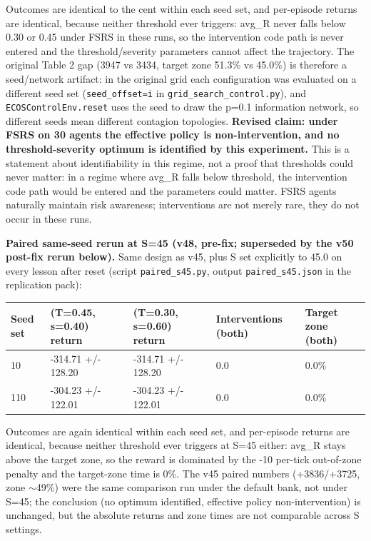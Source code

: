 \documentclass[11pt]{article}
\begin{document}
Outcomes are identical to the cent within each seed set, and per-episode returns are identical, because neither threshold ever triggers: avg\_R never falls below 0.30 or 0.45 under FSRS in these runs, so the intervention code path is never entered and the threshold/severity parameters cannot affect the trajectory. The original Table 2 gap (3947 vs 3434, target zone 51.3\% vs 45.0\%) is therefore a seed/network artifact: in the original grid each configuration was evaluated on a different seed set (\texttt{seed\_offset=i} in \texttt{grid\_search\_control.py}), and \texttt{ECOSControlEnv.reset} uses the seed to draw the p=0.1 information network, so different seeds mean different contagion topologies. \textbf{Revised claim: under FSRS on 30 agents the effective policy is non-intervention, and no threshold-severity optimum is identified by this experiment.} This is a statement about identifiability in this regime, not a proof that thresholds could never matter: in a regime where avg\_R falls below threshold, the intervention code path would be entered and the parameters could matter. FSRS agents naturally maintain risk awareness; interventions are not merely rare, they do not occur in these runs.

\textbf{Paired same-seed rerun at S=45 (v48, pre-fix; superseded by the v50 post-fix rerun below).} Same design as v45, plus S set explicitly to 45.0 on every lesson after reset (script \texttt{paired\_s45.py}, output \texttt{paired\_s45.json} in the replication pack):

\begin{table}[htbp]
\centering
\begin{tabular}{lllll}
\toprule
\textbf{Seed set} & \textbf{(T=0.45, s=0.40) return} & \textbf{(T=0.30, s=0.60) return} & \textbf{Interventions (both)} & \textbf{Target zone (both)} \\
\midrule
10 & -314.71 +/- 128.20 & -314.71 +/- 128.20 & 0.0 & 0.0\% \\
110 & -304.23 +/- 122.01 & -304.23 +/- 122.01 & 0.0 & 0.0\% \\
\bottomrule
\end{tabular}
\end{table}

Outcomes are again identical within each seed set, and per-episode returns are identical, because neither threshold ever triggers at S=45 either: avg\_R stays above the target zone, so the reward is dominated by the -10 per-tick out-of-zone penalty and the target-zone time is 0\%. The v45 paired numbers (+3836/+3725, zone $\sim$49\%) were the same comparison run under the default bank, not under S=45; the conclusion (no optimum identified, effective policy non-intervention) is unchanged, but the absolute returns and zone times are not comparable across S settings.
\end{document}
